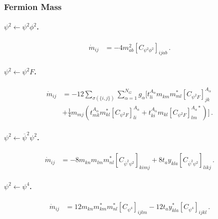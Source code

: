 \subsubsection{Fermion Mass}

\paragraph{\texorpdfstring{$\psi^2 \leftarrow \psi^2 \phi^2$}{fmassfrompsi2phi2}.}

\begin{align}
    \dot m_{ij} &= -4m_{ab}^2\left[ C_{\psi^2\phi^2}\right]_{ijab} \,.\label{fmass_psi2phi2}
\end{align}

\paragraph{\texorpdfstring{$\psi^2 \leftarrow \psi^2 F$.}{fmassfromphi2F}}

\begin{align}
    \dot m_{ij} &= -12\sum_{\sigma(\{i,j\})} \sum_{\alpha=1}^{N_G} g_\alpha 
    \Bigg[t^{A_\alpha}_{li}m_{km}^{\phantom *} m^*_{ml}\left[C_{\psi^2F}\right]_{jk}^{A_{\alpha}}
    \nonumber \\&+\frac{1}{4}m_{mj} \left(
    t^{A_\alpha}_{mk}m^*_{kl}\left[C_{\psi^2 F}\right]^{A_\alpha}_{li}+
    t^{A_\alpha}_{ki}m_{kl}\left[C_{\psi^2 F}\right]^{A_\alpha *}_{lm}\right)
    \Bigg]\,.\label{fmass_psi2F}
\end{align}

\paragraph{\texorpdfstring{$\psi^2 \leftarrow \overline \psi^2 \psi^2$.}{fmassfrompsibar2psi2}}

\begin{align}
    \dot m_{ij} &= -8m_{kn}m_{lm}m^*_{nl}\left[C_{\overline \psi^2 \psi^2}\right]_{kimj}
    +8 t_a y_{kla} \left[C_{\overline \psi^2 \psi^2}\right]_{likj} \,.\label{fmass_psibar2psi2}
\end{align}

\paragraph{\texorpdfstring{$\psi^2 \leftarrow \psi^4$.}{fmassfrompsi4}}

\begin{align}
   \dot m_{ij} &= 12 m_{kn}m_{km}^*m^*_{nl}\left[C_{\psi^4}\right]_{ijlm}- 12 t_{a}y^*_{kla} \left[C_{\psi^4}\right]_{ijkl}\,.
    \label{fmass_psi4}
\end{align}

